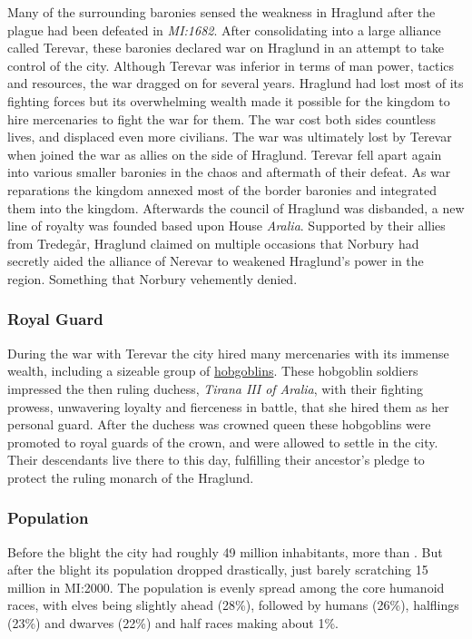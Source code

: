 Many of the surrounding baronies sensed the weakness in Hraglund after the
plague had been defeated in \emph{MI:1682}. After consolidating into a large
alliance called Terevar, these baronies declared war on Hraglund in an attempt
to take control of the city. Although Terevar was inferior in terms of man
power, tactics and resources, the war dragged on for several years. Hraglund
had lost most of its fighting forces but its overwhelming wealth made it
possible for the kingdom to hire mercenaries to fight the war for them. The
war cost both sides countless lives, and displaced even more civilians. The
war was ultimately lost by Terevar when  joined the war
as allies on the side of Hraglund. Terevar fell apart again into various
smaller baronies in the chaos and aftermath of their defeat. As war
reparations the kingdom annexed most of the border baronies and integrated
them into the kingdom. Afterwards the council of Hraglund was disbanded, a new
line of royalty was founded based upon House \emph{Aralia}. Supported by their
allies from Tredegår, Hraglund claimed on multiple occasions that Norbury had
secretly aided the alliance of Nerevar to weakened Hraglund's power in the
region. Something that Norbury vehemently denied.

\subsubsection{Royal Guard}
\label{sec:Royal Guard of Hraglund}

During the war with Terevar the city hired many mercenaries with its immense
wealth, including a sizeable group of \hyperref[sec:Hobgoblins]{hobgoblins}.
These hobgoblin soldiers impressed the then ruling duchess, \emph{Tirana III
  of Aralia}, with their fighting prowess, unwavering loyalty and fierceness
in battle, that she hired them as her personal guard. After the duchess was
crowned queen these hobgoblins were promoted to royal guards of the crown, and
were allowed to settle in the city. Their descendants live there to this day,
fulfilling their ancestor's pledge to protect the ruling monarch of the
Hraglund.

\subsubsection{Population}

Before the blight the city had roughly 49 million inhabitants, more than
. But after the blight its population dropped
drastically, just barely scratching 15 million in MI:2000. The population
is evenly spread among the core humanoid races, with elves being slightly
ahead (28\%), followed by humans (26\%), halflings (23\%) and dwarves
(22\%) and half races making about 1\%.

